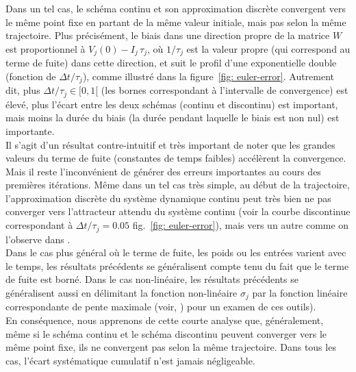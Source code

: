 Dans un tel cas, le schéma continu et son approximation discrète convergent vers le même point fixe en partant de la même valeur initiale, mais pas selon la même trajectoire. Plus précisément, le biais dans une direction propre de la matrice $ {W} $ est proportionnel à $ V_j (0) - I_j \, \tau_j$, où $ 1 / \tau_j $ est la valeur propre (qui correspond au terme de fuite) dans cette direction, et suit le profil d'une exponentielle double (fonction de $\Delta t / \tau_j$), comme illustré dans la figure~\ref{fig: euler-error}. Autrement dit, plus $\Delta t / \tau_j  \in [0, 1 [$ (les bornes correspondant à l'intervalle de convergence) est élevé, plus l'écart entre les deux schémas (continu et discontinu) est important, mais moins la durée du biais (la durée pendant laquelle le biais est non nul) est importante.\\

Il s'agit d'un résultat contre-intuitif et très important de noter que les grandes valeurs du terme de fuite (constantes de temps faibles) accélèrent la convergence. Mais il reste l'inconvénient de générer des erreurs importantes au cours des premières itérations. Même dans un tel cas très simple, au début de la trajectoire, l'approximation discrète du système dynamique continu peut très bien ne pas converger vers l'attracteur attendu du système continu (voir la courbe discontinue correspondant à $\Delta t / \tau_j = 0.05$ fig.~\ref{fig: euler-error}), mais vers un autre comme on l'observe dans \cite {Rougier:2009}.\\

Dans le cas plus général o\`u le terme de fuite, les poids ou les entrées varient avec le temps, les résultats précédents se généralisent compte tenu du fait que le terme de fuite est borné. Dans le cas non-linéaire, les résultats précédents se généralisent aussi en délimitant la fonction non-linéaire $\sigma_ {j}$ par la fonction linéaire correspondante de pente maximale (voir, \cite {Cessac:2007}) pour un examen de ces outils). \\%

En conséquence, nous apprenons de cette courte analyse que, généralement, même si le schéma continu et le schéma discontinu peuvent converger vers le même point fixe, ils ne convergent pas selon la même trajectoire. Dans tous les cas, l'écart systématique cumulatif n'est jamais négligeable.\\

